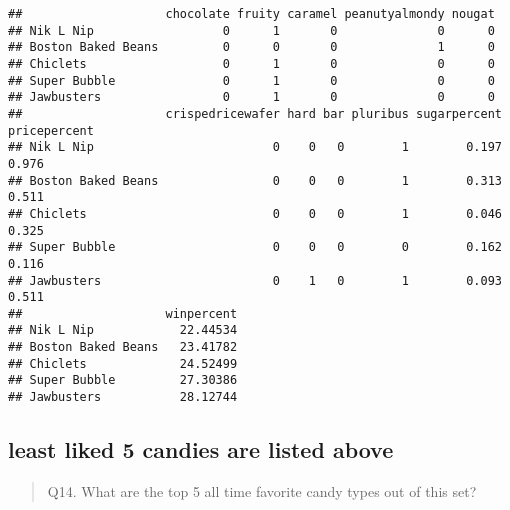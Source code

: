 \documentclass[
]{article}
\newenvironment{Shaded}{\begin{snugshade}}{\end{snugshade}}
\newcommand{\AttributeTok}[1]{\textcolor[rgb]{0.77,0.63,0.00}{#1}}
\newcommand{\CommentTok}[1]{\textcolor[rgb]{0.56,0.35,0.01}{\textit{#1}}}
\newcommand{\ConstantTok}[1]{\textcolor[rgb]{0.00,0.00,0.00}{#1}}
\newcommand{\DecValTok}[1]{\textcolor[rgb]{0.00,0.00,0.81}{#1}}
\newcommand{\FunctionTok}[1]{\textcolor[rgb]{0.00,0.00,0.00}{#1}}
\newcommand{\NormalTok}[1]{#1}
\newcommand{\SpecialCharTok}[1]{\textcolor[rgb]{0.00,0.00,0.00}{#1}}
\begin{document}
\begin{verbatim}
##                    chocolate fruity caramel peanutyalmondy nougat
## Nik L Nip                  0      1       0              0      0
## Boston Baked Beans         0      0       0              1      0
## Chiclets                   0      1       0              0      0
## Super Bubble               0      1       0              0      0
## Jawbusters                 0      1       0              0      0
##                    crispedricewafer hard bar pluribus sugarpercent pricepercent
## Nik L Nip                         0    0   0        1        0.197        0.976
## Boston Baked Beans                0    0   0        1        0.313        0.511
## Chiclets                          0    0   0        1        0.046        0.325
## Super Bubble                      0    0   0        0        0.162        0.116
## Jawbusters                        0    1   0        1        0.093        0.511
##                    winpercent
## Nik L Nip            22.44534
## Boston Baked Beans   23.41782
## Chiclets             24.52499
## Super Bubble         27.30386
## Jawbusters           28.12744
\end{verbatim}

\hypertarget{least-liked-5-candies-are-listed-above}{%
\subsection{least liked 5 candies are listed
above}\label{least-liked-5-candies-are-listed-above}}

\begin{quote}
Q14. What are the top 5 all time favorite candy types out of this set?
\end{quote}

\begin{Shaded}
\end{Shaded}
\end{document}
